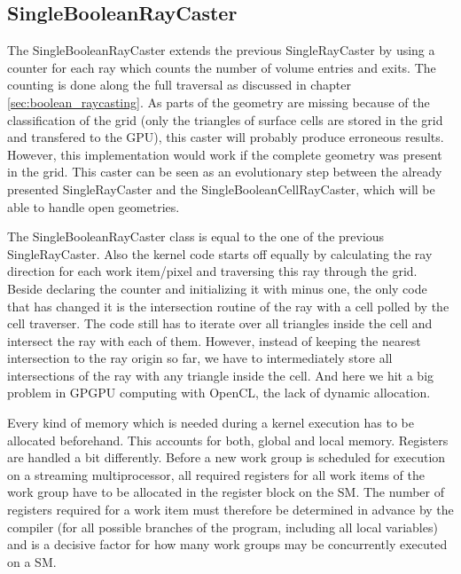\subsection{SingleBooleanRayCaster}
\label{sec:single_boolean}

The SingleBooleanRayCaster extends the previous SingleRayCaster by using a counter for each ray which counts the number of volume entries and exits. The counting is done along the full traversal as discussed in chapter \ref{sec:boolean_raycasting}. As parts of the geometry are missing because of the classification of the grid (only the triangles of surface cells are stored in the grid and transfered to the GPU), this caster will probably produce erroneous results. However, this implementation would work if the complete geometry was present in the grid. This caster can be seen as an evolutionary step between the already presented SingleRayCaster and the SingleBooleanCellRayCaster, which will be able to handle open geometries.

The SingleBooleanRayCaster class is equal to the one of the previous SingleRayCaster. Also the kernel code starts off equally by calculating the ray direction for each work item/pixel and traversing this ray through the grid. Beside declaring the counter and initializing it with minus one, the only code that has changed it is the intersection routine of the ray with a cell polled by the cell traverser. The code still has to iterate over all triangles inside the cell and intersect the ray with each of them. However, instead of keeping the nearest intersection to the ray origin so far, we have to intermediately store all intersections of the ray with any triangle inside the cell. And here we hit a big problem in GPGPU computing with OpenCL, the lack of dynamic allocation.

Every kind of memory which is needed during a kernel execution has to be allocated beforehand. This accounts for both, global and local memory. Registers are handled a bit differently. Before a new work group is scheduled for execution on a streaming multiprocessor, all required registers for all work items of the work group have to be allocated in the register block on the SM. The number of registers required for a work item must therefore be determined in advance by the compiler (for all possible branches of the program, including all local variables) and is a decisive factor for how many work groups may be concurrently executed on a SM.

